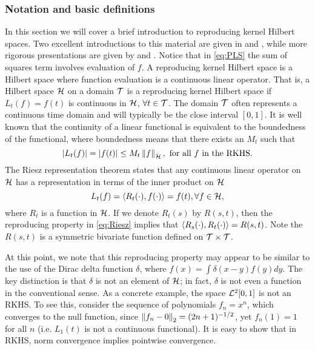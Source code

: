 \subsubsection{Notation and basic definitions}


In this section we will cover a brief introduction to reproducing kernel Hilbert spaces. Two excellent introductions to this material are given in \cite{Heckman:1997vp} and \cite{Storlie:2011tz}, while more rigorous presentations are given by \cite{Wahba:1990} and \cite{Aronszajn:1950tq}. 
Notice that in \eqref{eq:PLS} the sum of squares term involves evaluation of $f$. A reproducing kernel Hilbert space is a Hilbert space where function evaluation is a continuous linear operator. That is, a Hilbert space $\mathcal{H}$ on a domain $\mathcal{T}$ is a reproducing kernel Hilbert space if $L_t(f) = f(t)$ is continuous in $\mathcal{H}$, $\forall t \in \mathcal{T}$. The domain $\mathcal{T}$ often represents a continuous time domain and will typically be the close interval $[0,1]$. It is well known that the continuity of a linear functional is equivalent to the boundedness of the functional, where boundedness means that there exists an $M_t$ such that 
\begin{equation*}
	|L_t(f)|=|f(t)|\leq M_t\left\|f\right\|_{\mathcal{H}}, \mbox{ for all $f$ in the RKHS}.
\label{eq:}
\end{equation*}
The Riesz representation theorem states that any continuous linear operator on $\mathcal{H}$ has a representation in terms of the inner product on $\mathcal{H}$
\begin{equation}
	L_t(f) = \langle R_t(\cdot), f(\cdot) \rangle = f(t), \forall f\in \mathcal{H},
\label{eq:Riesz}
\end{equation}
where $R_t$ is a function in $\mathcal{H}$. If we denote $R_t(s)$ by $R(s,t)$, then the reproducing property in \eqref{eq:Riesz} implies that $\langle R_s(\cdot),  R_t(\cdot) \rangle = R(s,t)$. Note the $R(s,t)$ is a symmetric bivariate function defined on $\mathcal{T}\times\mathcal{T}$. %

At this point, we note that this reproducing property may appear to be similar to the use of the Dirac delta function $\delta$, where $f(x)=\int\delta(x-y)f(y)dy$. The key distinction is that $\delta$ is not an element of $\mathcal{H}$; in fact, $\delta$ is not even a function in the conventional sense.  As a concrete example, the space $\mathcal{L}^2[0,1]$ is not an RKHS. To see this, consider the sequence of polynomials $f_n = x^n$, which converges to the null function, since $\left\|f_n-0\right\|_2=(2n+1)^{-1/2}$, yet $f_n(1)=1$ for all $n$ (i.e. $L_1(t)$ is not a continuous functional). It is easy to show that in RKHS, norm convergence implies pointwise convergence. 


